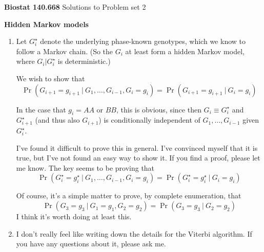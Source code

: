 \documentclass[12pt]{article}
\begin{document}
\thispagestyle{empty}

\noindent \textbf{Biostat 140.668} \hfill Solutions to Problem set 2

\bigskip 

\noindent \textbf{Hidden Markov models}

\begin{enumerate}

\item Let $G_i^\star$ denote the underlying phase-known genotypes, which we
know to follow a Markov chain.  (So the $G_i$ at least form a hidden
Markov model, where $G_i | G_i^\star$ is deterministic.)

We wish to show that 
$$\Pr(G_{i+1} = g_{i+1} \ | \ G_1, \dots,  G_{i-1}, G_i=g_i) = 
\Pr(G_{i+1}=g_{i+1} \ | \ G_i=g_i)$$

In the case that $g_i = AA \text{ or } BB$, this is obvious, since
then $G_i \equiv G_i^\star$ and $G_{i+1}^\star$ (and thus also
$G_{i+1}$) is conditionally independent of $G_1, \dots, G_{i-1}$ given
$G_i^\star$.

I've found it difficult to prove this in general.  I've convinced
myself that it is true, but I've not found an easy way to show it.  
If you find a proof, please let me know.  The key seems to be proving
that
$$\Pr(G_i^\star = g_i^\star \ | \ G_1, \dots, G_{i-1}, G_i = g_i) = 
\Pr(G_i^\star = g_i^\star \ | \ G_i = g_i)$$

Of course, it's a simple matter to prove, by complete enumeration, that
$$\Pr(G_3 = g_3 \ | \ G_1 = g_1, G_2 = g_2) = \Pr(G_3 = g_3 \ | \ G_2
= g_2)$$
I think it's worth doing at least this.


\item I don't really feel like writing down the details for the
Viterbi algorithm.  If you have any questions about it, please ask me.



 
\end{enumerate}
\end{document}
